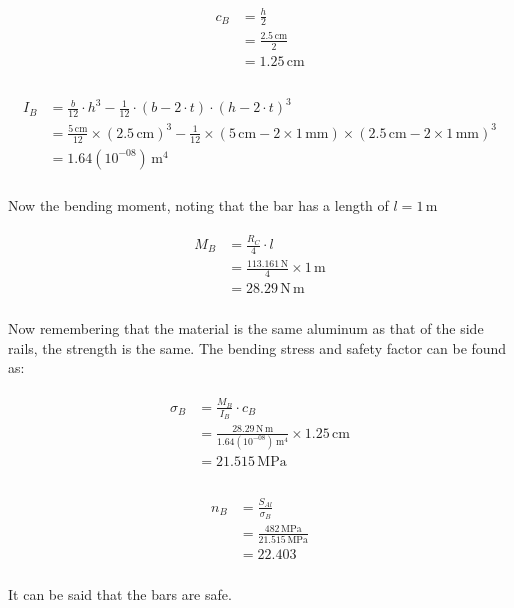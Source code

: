 \documentclass{article}
\begin{document}
\begin{align}
\begin{split}
c_{B}	&= \frac{h}{2}\\
		&= \frac{2.5\,\mathrm{cm}}{2}\\
		&= 1.25\,\mathrm{cm}\\
\end{split}
\end{align}

\begin{align}
\begin{split}
I_{B}	&= \frac{b}{12} \cdot h^{3} - \frac{1}{12} \cdot \left(b - 2 \cdot t\right) \cdot \left(h - 2 \cdot t\right)^{3}\\
		&= \frac{5\,\mathrm{cm}}{12} \times \left(2.5\,\mathrm{cm}\right)^{3} - \frac{1}{12} \times \left(5\,\mathrm{cm} - 2 \times 1\,\mathrm{mm}\right) \times \left(2.5\,\mathrm{cm} - 2 \times 1\,\mathrm{mm}\right)^{3}\\
		&= 1.64(10^{-08})\,\mathrm{m^{4}}\\
\end{split}
\end{align}

Now the bending moment, noting that the bar has a length of $l = 1\,\mathrm{m}$

\begin{align}
\begin{split}
M_{B}	&= \frac{R_{C}}{4} \cdot l\\
		&= \frac{113.161\,\mathrm{N}}{4} \times 1\,\mathrm{m}\\
		&= 28.29\,\mathrm{N \, m}\\
\end{split}
\end{align}

Now remembering that the material is the same aluminum as that of the side rails, the
strength is the same. The bending stress and safety factor can be found as:

\begin{align}
\begin{split}
\sigma_{B}	&= \frac{M_{B}}{I_{B}} \cdot c_{B}\\
			&= \frac{28.29\,\mathrm{N \, m}}{1.64(10^{-08})\,\mathrm{m^{4}}} \times 1.25\,\mathrm{cm}\\
			&= 21.515\,\mathrm{MPa}\\
\end{split}
\end{align}

\begin{align}
\begin{split}
n_{B}	&= \frac{S_{Al}}{\sigma_{B}}\\
		&= \frac{482\,\mathrm{MPa}}{21.515\,\mathrm{MPa}}\\
		&= 22.403\\
\end{split}
\end{align}

It can be said that the bars are safe.
\end{document}
